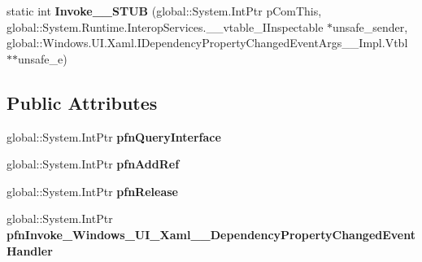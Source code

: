 \begin{DoxyCompactItemize}
\item 
\mbox{\label{struct_windows_1_1_u_i_1_1_xaml_1_1_dependency_property_changed_event_handler_____impl_1_1_vtbl_a81bd48ea1dee25b56d32cf0a180fc74c}} 
static int {\bfseries Invoke\+\_\+\+\_\+\+S\+T\+UB} (global\+::\+System.\+Int\+Ptr p\+Com\+This, global\+::\+System.\+Runtime.\+Interop\+Services.\+\_\+\+\_\+vtable\+\_\+\+I\+Inspectable $\ast$unsafe\+\_\+sender, global\+::\+Windows.\+U\+I.\+Xaml.\+I\+Dependency\+Property\+Changed\+Event\+Args\+\_\+\+\_\+\+Impl.\+Vtbl $\ast$$\ast$unsafe\+\_\+e)
\end{DoxyCompactItemize}
\subsection*{Public Attributes}
\begin{DoxyCompactItemize}
\item 
\mbox{\label{struct_windows_1_1_u_i_1_1_xaml_1_1_dependency_property_changed_event_handler_____impl_1_1_vtbl_a5cd1fc1889bd96519b330f153f6382da}} 
global\+::\+System.\+Int\+Ptr {\bfseries pfn\+Query\+Interface}
\item 
\mbox{\label{struct_windows_1_1_u_i_1_1_xaml_1_1_dependency_property_changed_event_handler_____impl_1_1_vtbl_aea2d353570001478a031a39bc54ffc6f}} 
global\+::\+System.\+Int\+Ptr {\bfseries pfn\+Add\+Ref}
\item 
\mbox{\label{struct_windows_1_1_u_i_1_1_xaml_1_1_dependency_property_changed_event_handler_____impl_1_1_vtbl_abef0f3cd00594a7801f3b24077b53963}} 
global\+::\+System.\+Int\+Ptr {\bfseries pfn\+Release}
\item 
\mbox{\label{struct_windows_1_1_u_i_1_1_xaml_1_1_dependency_property_changed_event_handler_____impl_1_1_vtbl_a0fcc6e76efbe24d053fb024cc6c61041}} 
global\+::\+System.\+Int\+Ptr {\bfseries pfn\+Invoke\+\_\+\+Windows\+\_\+\+U\+I\+\_\+\+Xaml\+\_\+\+\_\+\+Dependency\+Property\+Changed\+Event\+Handler}
\end{DoxyCompactItemize}
